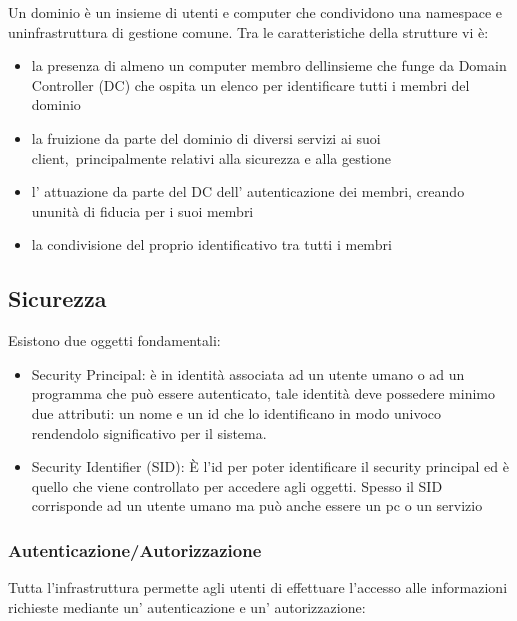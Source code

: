 \documentclass[
]{article}
\providecommand{\tightlist}{%
  \setlength{\itemsep}{0pt}\setlength{\parskip}{0pt}}
\begin{document}
{Un dominio è un insieme di utenti e computer che condividono una
namespace e un\textquotesingle infrastruttura di gestione comune. Tra le
caratteristiche della strutture vi è:}

\begin{itemize}
\tightlist
\item
  {la presenza di almeno un computer membro dell\textquotesingle insieme
  che funge da Domain Controller (DC) che ospita un elenco per
  identificare tutti i membri del dominio }
\item
  {la fruizione da parte del dominio di diversi servizi ai suoi
  }{client,}{~principalmente relativi alla sicurezza e alla gestione }
\item
  {l' attuazione da parte del DC dell' autenticazione dei membri,
  creando un\textquotesingle unità di fiducia per i suoi membri }
\item
  {la condivisione del proprio identificativo tra tutti i membri }
\end{itemize}

\subsection{\texorpdfstring{{Sicurezza}}{Sicurezza}}\label{h.c5edo6xmc1ab}

{Esistono due oggetti fondamentali:}

\begin{itemize}
\tightlist
\item
  {Security Principal: è in identità associata ad un utente umano o ad
  un programma che può essere autenticato, tale identità deve possedere
  minimo due attributi: un nome e un id che lo identificano in modo
  univoco rendendolo significativo per il sistema.}
\item
  {Security Identifier (SID): È l'id per poter identificare il security
  principal ed è quello che viene controllato per accedere agli oggetti.
  Spesso il SID corrisponde ad un utente umano ma può anche essere un pc
  o un servizio}
\end{itemize}

\subsubsection{\texorpdfstring{{Autenticazione/Autorizzazione}}{Autenticazione/Autorizzazione}}\label{h.9hwc1lanagzu}

{Tutta l'infrastruttura permette agli utenti di effettuare l'accesso
alle informazioni richieste mediante un' autenticazione e un'
autorizzazione:}
\end{document}
